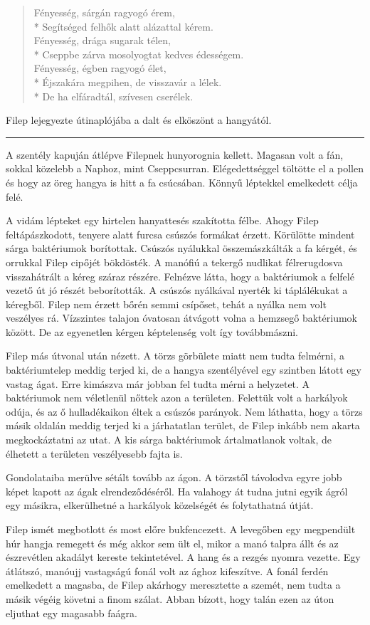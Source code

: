 \documentclass[10pt]{memoir}
\renewcommand{\pfbreakdisplay}{\bigskip \ding{166} \bigskip}
\newcommand{\secbreak}{\fancybreak{\pfbreakdisplay}\indent}
\newcommand{\napdal}{
  Fényesség, sárgán ragyogó érem, \\*
  Segítséged felhők alatt alázattal kérem. \\
  Fényesség, drága sugarak télen, \\*
  Cseppbe zárva mosolyogtat kedves édességem. \\
  Fényesség, égben ragyogó élet, \\*
  Éjszakára megpihen, de visszavár a lélek. \\*
  De ha elfáradtál, szívesen cserélek.
}
\begin{document}
\begin{verse}
\napdal
\end{verse}

Filep lejegyezte útinaplójába a dalt és elköszönt a hangyától.

\secbreak

A szentély kapuján átlépve Filepnek hunyorognia kellett. Magasan volt a fán,
sokkal közelebb a Naphoz, mint Cseppcsurran. Elégedettséggel töltötte el a
pollen és hogy az öreg hangya is hitt a fa csúcsában. Könnyű léptekkel
emelkedett célja felé.

A vidám lépteket egy hirtelen hanyattesés szakította félbe. Ahogy Filep
feltápászkodott, tenyere alatt furcsa csúszós formákat érzett. Körülötte
mindent sárga baktériumok borítottak. Csúszós nyálukkal összemászkálták a fa
kérgét, és orrukkal Filep cipőjét bökdösték. A manófiú a tekergő nudlikat
félrerugdosva visszahátrált a kéreg száraz részére. Felnézve látta, hogy a
baktériumok a felfelé vezető út jó részét beborították. A csúszós nyálkával
nyerték ki táplálékukat a kéregből. Filep nem érzett bőrén semmi csípőset,
tehát a nyálka nem volt veszélyes rá. Vízszintes talajon óvatosan átvágott
volna a hemzsegő baktériumok között. De az egyenetlen kérgen képtelenség volt
így továbbmászni.

Filep más útvonal után nézett. A törzs görbülete miatt nem tudta felmérni, a
baktériumtelep meddig terjed ki, de a hangya szentélyével egy szintben látott
egy vastag ágat. Erre kimászva már jobban fel tudta mérni a helyzetet. A
baktériumok nem véletlenül nőttek azon a területen. Felettük volt a harkályok
odúja, és az ő hulladékaikon éltek a csúszós parányok. Nem láthatta, hogy a
törzs másik oldalán meddig terjed ki a járhatatlan terület, de Filep inkább nem
akarta megkockáztatni az utat. A kis sárga baktériumok ártalmatlanok voltak, de
élhetett a területen veszélyesebb fajta is.

Gondolataiba merülve sétált tovább az ágon. A törzstől távolodva egyre jobb
képet kapott az ágak elrendeződéséről. Ha valahogy át tudna jutni egyik ágról
egy másikra, elkerülhetné a harkályok közelségét és folytathatná útját.

Filep ismét megbotlott és most előre bukfencezett. A levegőben egy megpendült
húr hangja remegett és még akkor sem ült el, mikor a manó talpra állt és az
észrevétlen akadályt kereste tekintetével. A hang és a rezgés nyomra vezette.
Egy átlátszó, manóujj vastagságú fonál volt az ághoz kifeszítve. A fonál ferdén
emelkedett a magasba, de Filep akárhogy meresztette a szemét, nem tudta a másik
végéig követni a finom szálat. Abban bízott, hogy talán ezen az úton eljuthat
egy magasabb faágra.
\end{document}
